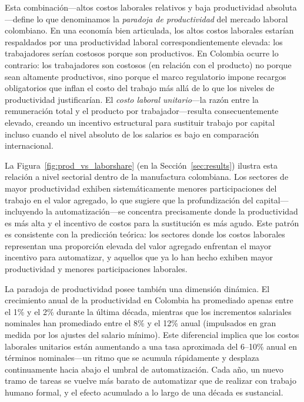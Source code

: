 \documentclass{article}
\begin{document}
Esta combinaci\'on---altos costos laborales relativos y baja productividad absoluta---define lo que denominamos la \textit{paradoja de productividad} del mercado laboral colombiano. En una econom\'ia bien articulada, los altos costos laborales estar\'ian respaldados por una productividad laboral correspondientemente elevada: los trabajadores ser\'ian costosos porque son productivos. En Colombia ocurre lo contrario: los trabajadores son costosos (en relaci\'on con el producto) no porque sean altamente productivos, sino porque el marco regulatorio impone recargos obligatorios que inflan el costo del trabajo m\'as all\'a de lo que los niveles de productividad justificar\'ian. El \textit{costo laboral unitario}---la raz\'on entre la remuneraci\'on total y el producto por trabajador---resulta consecuentemente elevado, creando un incentivo estructural para sustituir trabajo por capital incluso cuando el nivel absoluto de los salarios es bajo en comparaci\'on internacional.


La Figura~\ref{fig:prod_vs_laborshare} (en la Secci\'on~\ref{sec:results}) ilustra esta relaci\'on a nivel sectorial dentro de la manufactura colombiana. Los sectores de mayor productividad exhiben sistem\'aticamente menores participaciones del trabajo en el valor agregado, lo que sugiere que la profundizaci\'on del capital---incluyendo la automatizaci\'on---se concentra precisamente donde la productividad es m\'as alta y el incentivo de costos para la sustituci\'on es m\'as agudo. Este patr\'on es consistente con la predicci\'on te\'orica: los sectores donde los costos laborales representan una proporci\'on elevada del valor agregado enfrentan el mayor incentivo para automatizar, y aquellos que ya lo han hecho exhiben mayor productividad y menores participaciones laborales.

La paradoja de productividad posee tambi\'en una dimensi\'on din\'amica. El crecimiento anual de la productividad en Colombia ha promediado apenas entre el 1\% y el 2\% durante la \'ultima d\'ecada, mientras que los incrementos salariales nominales han promediado entre el 8\% y el 12\% anual (impulsados en gran medida por los ajustes del salario m\'inimo). Este diferencial implica que los costos laborales unitarios est\'an aumentando a una tasa aproximada del 6--10\% anual en t\'erminos nominales---un ritmo que se acumula r\'apidamente y desplaza continuamente hacia abajo el umbral de automatizaci\'on. Cada a\~no, un nuevo tramo de tareas se vuelve m\'as barato de automatizar que de realizar con trabajo humano formal, y el efecto acumulado a lo largo de una d\'ecada es sustancial.
\end{document}
